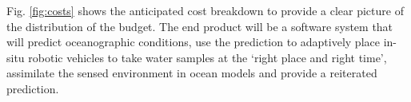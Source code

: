 

Fig. \ref{fig:costs} shows the anticipated cost breakdown to provide a
clear picture of the distribution of the budget. The end product will
be a software system that will predict oceanographic conditions, use
the prediction to adaptively place in-situ robotic vehicles to take
water samples at the ‘right place and right time’, assimilate the
sensed environment in ocean models and provide a reiterated
prediction. 

